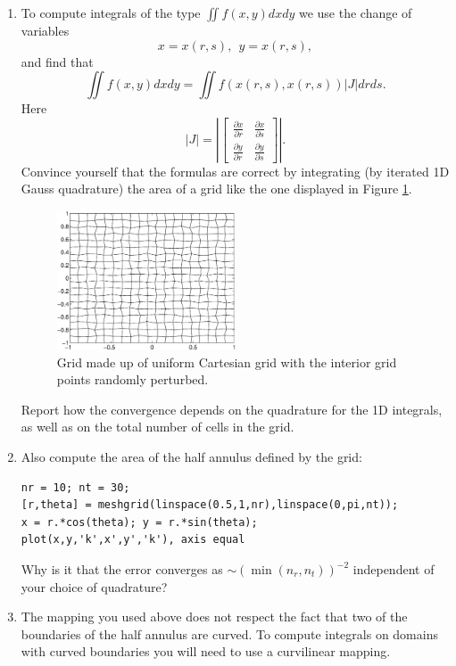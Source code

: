 \documentclass[11pt]{article}
\begin{document}
\begin{enumerate}
\item To compute integrals of the type $\iint f(x,y) dx dy $ we use the change of variables 
\[
x = x(r,s),\ \ y = x(r,s),
\]
and find that 
 \[
 \iint f(x,y) dx dy = \iint f(x(r,s),x(r,s)) | J | dr ds. 
 \]
 Here 
 \[
  | J | = \left| \left[  \begin{array}{cc}
  \frac{\partial x}{\partial r} & \frac{\partial x}{\partial s} \\
  \frac{\partial y}{\partial r} & \frac{\partial y}{\partial s}
   \end{array} \right] \right|.
  \]
Convince yourself that the formulas are correct by integrating (by iterated 1D Gauss quadrature) the area of a grid like the one displayed in Figure \ref{Fig:Grid}.
\begin{figure}[h]
  \begin{center}
  \includegraphics[width=0.5\textwidth]{grid} 
  \caption{Grid made up of uniform Cartesian grid with the interior grid points randomly perturbed. \label{Fig:Grid}}
  \end{center}
\end{figure}
Report how the convergence depends on the quadrature for the 1D integrals, as well as on the total number of cells in the grid.


\item Also compute the area of the half annulus defined by the grid:
\begin{verbatim}
nr = 10; nt = 30; 
[r,theta] = meshgrid(linspace(0.5,1,nr),linspace(0,pi,nt));
x = r.*cos(theta); y = r.*sin(theta); 
plot(x,y,'k',x',y','k'), axis equal
\end{verbatim}

Why is it that the error converges as $\sim (\min (n_r,n_t))^{-2} $ independent of your choice of quadrature? 

\item The mapping you used above does not respect the fact that two of the boundaries of the half annulus are curved. To compute integrals on domains with curved boundaries you will need to use a curvilinear mapping. 


\end{enumerate}
\end{document}
